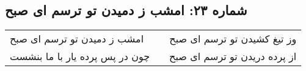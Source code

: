 \begin{center}
\section*{شماره ۲۳: امشب ز دمیدن تو ترسم ای صبح}
\label{sec:023}
\begin{longtable}{l p{0.5cm} r}
امشب ز دمیدن تو ترسم ای صبح
&&
وز تیغ کشیدن تو ترسم ای صبح
\\
چون در پس پرده یار با ما بنشست
&&
از پرده دریدن تو ترسم ای صبح
\\
\end{longtable}
\end{center}
